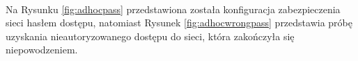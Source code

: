 \documentclass[wide,a4paper,titlepage,12pt] {article}
\begin{document}

\paragraph{} %
\label{par:}
Na Rysunku \ref{fig:adhocpass} przedstawiona została konfiguracja zabezpieczenia sieci hasłem dostępu, natomiast Rysunek \ref{fig:adhocwrongpass} przedstawia próbę uzyskania nieautoryzowanego dostępu do sieci, która zakończyła się niepowodzeniem.
\end{document}
